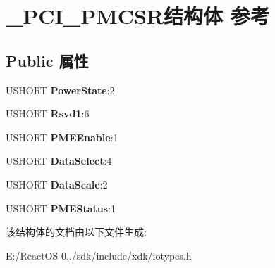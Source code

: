 \hypertarget{struct___p_c_i___p_m_c_s_r}{}\section{\+\_\+\+P\+C\+I\+\_\+\+P\+M\+C\+S\+R结构体 参考}
\label{struct___p_c_i___p_m_c_s_r}
\subsection*{Public 属性}
\begin{DoxyCompactItemize}
\item 
\mbox{\label{struct___p_c_i___p_m_c_s_r_a1e1be9e5d0a294b8904d6a14c962efa2}} 
U\+S\+H\+O\+RT {\bfseries Power\+State}\+:2
\item 
\mbox{\label{struct___p_c_i___p_m_c_s_r_a60832ffb294ecfc003f207060e9cd461}} 
U\+S\+H\+O\+RT {\bfseries Rsvd1}\+:6
\item 
\mbox{\label{struct___p_c_i___p_m_c_s_r_ab24a26aaf8388bd58fdd282f3f323f00}} 
U\+S\+H\+O\+RT {\bfseries P\+M\+E\+Enable}\+:1
\item 
\mbox{\label{struct___p_c_i___p_m_c_s_r_a1b5ec0e38f7d0593f8eacea05dce715d}} 
U\+S\+H\+O\+RT {\bfseries Data\+Select}\+:4
\item 
\mbox{\label{struct___p_c_i___p_m_c_s_r_af31980af9c87f1e1b3e748f64a31d571}} 
U\+S\+H\+O\+RT {\bfseries Data\+Scale}\+:2
\item 
\mbox{\label{struct___p_c_i___p_m_c_s_r_aa3e969fb9e0673642d20155926345cc6}} 
U\+S\+H\+O\+RT {\bfseries P\+M\+E\+Status}\+:1
\end{DoxyCompactItemize}


该结构体的文档由以下文件生成\+:\begin{DoxyCompactItemize}
\item 
E\+:/\+React\+O\+S-\/0../sdk/include/xdk/iotypes.\+h\end{DoxyCompactItemize}
